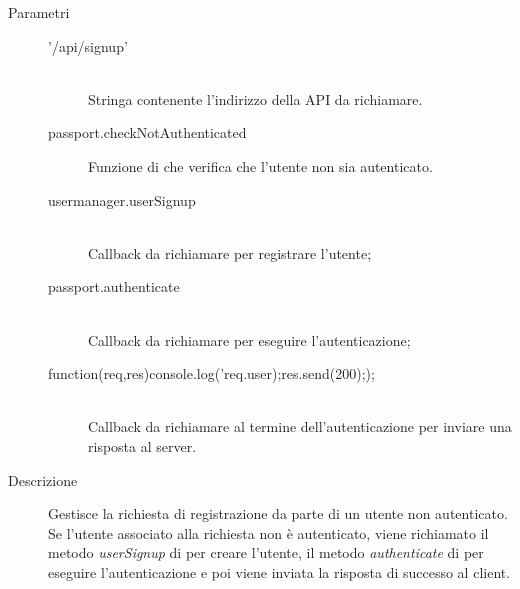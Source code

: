 \begin{description}
\begin{description}
\begin{mldescription}
 \begin{description}
    \item[Parametri] \hfill
     \begin{description}
      \item['/api/signup'] \hfill \\
      Stringa contenente l'indirizzo della API da richiamare.
      \item[passport.checkNotAuthenticated]
      Funzione di  che verifica che l'utente non sia autenticato.
      \item[usermanager.userSignup] \hfill \\
      Callback da richiamare per registrare l'utente;
      \item[passport.authenticate] \hfill \\
      Callback da richiamare per eseguire l'autenticazione;
      \item[function(req,res){console.log('req.user);res.send(200););}] \hfill \\
      Callback da richiamare al termine dell'autenticazione per inviare una risposta al server.
     \end{description}
    \item[Descrizione]
    Gestisce la richiesta di registrazione da parte di un utente non autenticato. Se l'utente associato alla richiesta non è autenticato, viene richiamato il metodo \textit{userSignup} di  per creare l'utente, il metodo \textit{authenticate} di  per eseguire l'autenticazione e poi viene inviata la risposta di successo al client.
 \end{description}
 

\end{mldescription}
\end{description}
\end{description}
